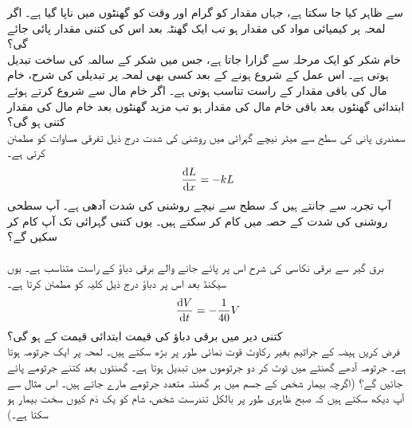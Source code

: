 سے ظاہر کیا جا سکتا ہے، جہاں مقدار  کو گرام اور  وقت  کو گھنٹوں میں ناپا گیا ہے۔ اگر لمحہ  پر کیمیائی مواد کی مقدار  ہو تب ایک گھنٹہ بعد اس کی کتنی مقدار پائی جائے گی؟\\
خام شکر کو  ایک مرحلہ سے گزارا جاتا ہے، جس میں شکر کے  سالمہ  کی ساخت تبدیل ہوتی ہے۔ اس عمل کے شروع ہونے کے بعد کسی بھی لمحہ پر تبدیلی کی شرح،   خام مال کی باقی مقدار کے راست تناسب ہوتی ہے۔ اگر  خام مال سے شروع کرتے ہوئے ابتدائی  گھنٹوں بعد باقی خام مال کی مقدار   ہو تب مزید  گھنٹوں بعد خام مال کی مقدار کتنی ہو گی؟
\\
سمندری پانی کی سطح سے  میٹر نیچے  گہرائی میں روشنی  کی شدت  درج ذیل تفرقی مساوات کو مطمئن کرتی ہے۔
\begin{align*}
\frac{\dif L}{\dif x}=-kL
\end{align*}
آپ تجربہ سے جانتے ہیں کہ سطح سے  نیچے روشنی کی شدت آدھی ہے۔ آپ سطحی روشنی کی شدت کے   حصہ میں کام کر سکتے ہیں۔ یوں کتنی گہرائی تک آپ کام کر سکیں گے؟\\
\\
برق گیر  سے برقی نکاسی کی شرح اس پر  پائے جانے والے برقی دباؤ کے راست متناسب ہے۔ یوں  سیکنڈ بعد اس پر دباؤ  درج ذیل کلیہ کو مطمئن کرتا ہے۔
\begin{align*}
\frac{\dif V}{\dif t}=-\frac{1}{40}V
\end{align*}
کتنی دیر میں برقی دباؤ کی قیمت ابتدائی قیمت کے  ہو گی؟
\\
فرض کریں ہیضہ کے جراثیم بغیر رکاوٹ قوت نمائی طور پر بڑھ سکتے ہیں۔ لمحہ  پر ایک جرثومہ ہوتا ہے۔ جرثومہ  آدھے  گھنٹے میں ٹوٹ کر دو جرثوموں میں تبدیل ہوتا ہے۔  گھنٹوں بعد کتنے جرثومے پائے جائیں گے؟ (اگرچہ بیمار شخص کے جسم میں ہر گھنٹہ متعدد جرثومے مارے جاتے ہیں۔ اس مثال سے آپ دیکھ سکتے ہیں کہ صبح ظاہری طور پر بالکل تندرست شخص، شام کو یک دَم کیوں   سخت بیمار ہو سکتا ہے۔)\\
